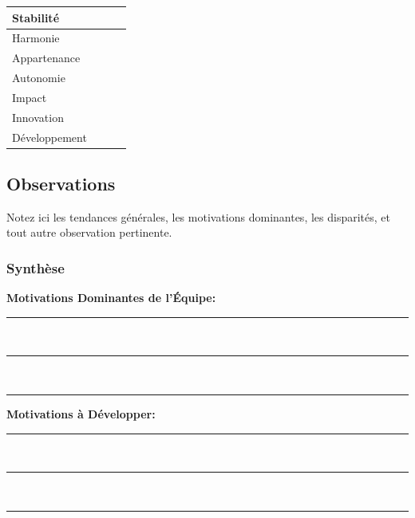 \documentclass[parskip=full]{scrartcl}
\begin{document}
\begin{multicols}{2}
\begin{minipage}[t]{0.45\textwidth}
{\begin{tabular*}{\textwidth}{l|c|c|c}
                \hline Stabilité           &                             &                        &                       \\
                \hline Harmonie            &                             &                        &                       \\
                \hline Appartenance        &                             &                        &                       \\
                \hline Autonomie           &                             &                        &                       \\
                \hline Impact              &                             &                        &                       \\
                \hline Innovation          &                             &                        &                       \\
                \hline Développement       &                             &                        &
            \end{tabular*}
        }
    \end{minipage}

    \begin{minipage}[t]{0.45\textwidth}
        \subsection*{Observations}
        Notez ici les tendances générales, les motivations dominantes, les disparités, et tout autre observation pertinente.

        \subsubsection*{Synthèse}
        \textbf{Motivations Dominantes de l'Équipe:} \\
        \textcolor{lightgray}{\rule{\textwidth}{0.1pt}} \\
        \textcolor{lightgray}{\rule{\textwidth}{0.1pt}} \\
        \textcolor{lightgray}{\rule{\textwidth}{0.1pt}}

        \textbf{Motivations à Développer:} \\
        \textcolor{lightgray}{\rule{\textwidth}{0.1pt}} \\
        \textcolor{lightgray}{\rule{\textwidth}{0.1pt}} \\
        \textcolor{lightgray}{\rule{\textwidth}{0.1pt}}


\end{minipage}
\end{multicols}
\end{document}
